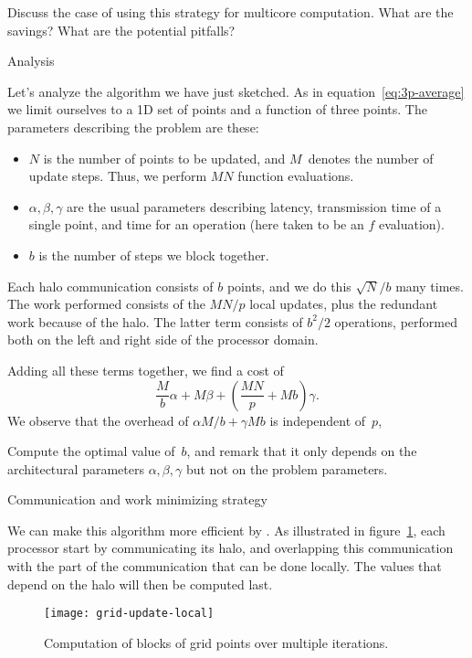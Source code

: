 \begin{exercise}
  Discuss the case of using this strategy for multicore computation.
  What are the savings? What are the potential pitfalls?
\end{exercise}

 {Analysis}

Let's analyze the algorithm we have just sketched.  As in
equation~\eqref{eq:3p-average} we limit ourselves to a 1D set of
points and a function of three points. The parameters describing the
problem are these:
\begin{itemize}
\item $N$ is the number of points to be updated, and $M$~denotes the
  number of update steps. Thus, we perform $MN$ function evaluations.
\item $\alpha,\beta,\gamma$ are the usual parameters describing
  latency, transmission time of a single point, and time for an
  operation (here taken to be an $f$ evaluation).
\item $b$ is the number of steps we block together.
\end{itemize}
Each halo communication consists of $b$ points, and we do this $\sqrt
N/b$ many times.  The work performed consists of the $MN/p$ local
updates, plus the redundant work because of the halo. The latter term
consists of $b^2/2$ operations, performed both on the left and right
side of the processor domain.

Adding all these terms together, we find a cost of
\[ \frac Mb\alpha+M\beta+\left(\frac {MN}p+Mb\right)\gamma. \]
We observe that the overhead of $\alpha M/b+\gamma Mb$ is independent of~$p$,
\begin{exercise}
  Compute the optimal value of~$b$, and remark that it only depends on
  the architectural parameters $\alpha,\beta,\gamma$ but not on the
  problem parameters.
\end{exercise}

 {Communication and work minimizing strategy}

We can make this algorithm more efficient by 
.
As illustrated in
figure~\ref{fig:grid-update-local}, each processor start by
communicating its halo, and overlapping this communication with the
part of the communication that can be done locally. The values that
depend on the halo will then be computed last.

\begin{figure}[ht]
\texttt{[image: grid-update-local]}
\caption{Computation of blocks of grid points over multiple iterations.}
\label{fig:grid-update-local}
\end{figure}

